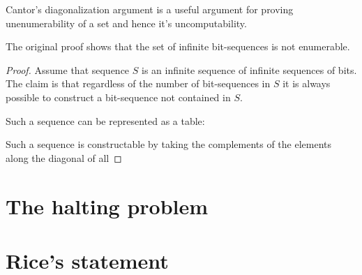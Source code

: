 Cantor's diagonalization argument is a useful argument for proving
unenumerability of a set and hence it's uncomputability.

The original proof shows that the set of infinite bit-sequences is not
enumerable.

\begin{proof} Assume that sequence $S$ is an infinite sequence of infinite
sequences of bits. The claim is that regardless of the number of bit-sequences
in $S$ it is always possible to construct a bit-sequence not contained in $S$.

Such a sequence can be represented as a table:


Such a sequence is constructable by taking the complements of the elements along the diagonal of all 



\end{proof}


\section{The halting problem}

\section{Rice's statement}
